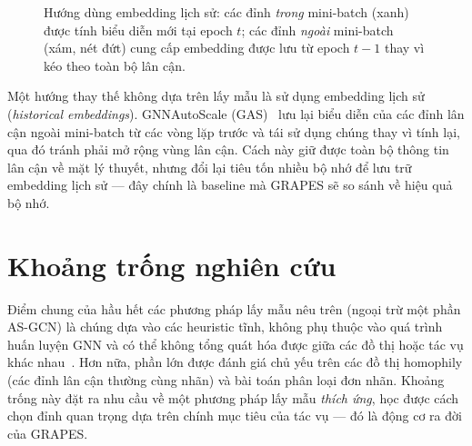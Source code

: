 \begin{figure}[htbp]
{}
\caption{Hướng dùng embedding lịch sử: các đỉnh \textit{trong} mini-batch (xanh) được tính biểu diễn mới tại epoch $t$; các đỉnh \textit{ngoài} mini-batch (xám, nét đứt) cung cấp embedding được lưu từ epoch $t{-}1$ thay vì kéo theo toàn bộ lân cận.}
\label{fig:historical-embeddings}
\end{figure}

Một hướng thay thế không dựa trên lấy mẫu là sử dụng embedding lịch sử (\textit{historical embeddings}). GNNAutoScale (GAS)~\cite{Fey2021GNNAutoScale} lưu lại biểu diễn của các đỉnh lân cận ngoài mini-batch từ các vòng lặp trước và tái sử dụng chúng thay vì tính lại, qua đó tránh phải mở rộng vùng lân cận. Cách này giữ được toàn bộ thông tin lân cận về mặt lý thuyết, nhưng đổi lại tiêu tốn nhiều bộ nhớ để lưu trữ embedding lịch sử --- đây chính là baseline mà GRAPES sẽ so sánh về hiệu quả bộ nhớ.

\section{Khoảng trống nghiên cứu}

Điểm chung của hầu hết các phương pháp lấy mẫu nêu trên (ngoại trừ một phần AS-GCN) là chúng dựa vào các heuristic tĩnh, không phụ thuộc vào quá trình huấn luyện GNN và có thể không tổng quát hóa được giữa các đồ thị hoặc tác vụ khác nhau~\cite{Younesian2023GRAPES}. Hơn nữa, phần lớn được đánh giá chủ yếu trên các đồ thị homophily (các đỉnh lân cận thường cùng nhãn) và bài toán phân loại đơn nhãn. Khoảng trống này đặt ra nhu cầu về một phương pháp lấy mẫu \textit{thích ứng}, học được cách chọn đỉnh quan trọng dựa trên chính mục tiêu của tác vụ --- đó là động cơ ra đời của GRAPES.

